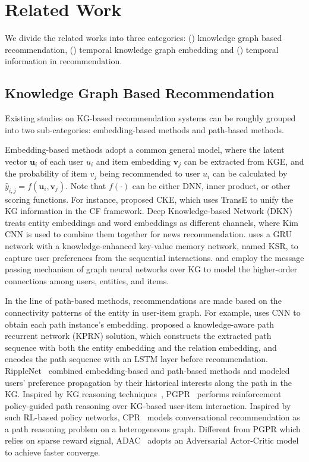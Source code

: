 \section{Related Work}
\label{sec:related}

We divide the related works into three categories: () knowledge 
graph based recommendation, () temporal knowledge graph embedding
and ()  temporal information in 
recommendation.


\subsection{Knowledge Graph Based Recommendation}

Existing studies on KG-based recommendation systems \cite{surveyRec} can be roughly grouped into two sub-categories: embedding-based methods and path-based
methods.

Embedding-based methods adopt a common general model, where the latent vector
$\boldsymbol{u}_i$ of each user $u_i$ and item embedding $\boldsymbol{v}_j$ can 
be
extracted from KGE, and the probability  of item $v_j$ being recommended to
user $u_i$ can be calculated by $\hat{y}_{i, j}=f\left(\mathbf{u}_{i},
\mathbf{v}_{j}\right)$. Note that $f(\cdot)$ can be either DNN, inner product,
or other scoring functions.  
%
For instance, \cite{CKE} proposed CKE, which uses TransE to unify the KG information in the CF framework.
%
Deep Knowledge-based Network (DKN) \cite{DKN} treats entity embeddings and word embeddings as different channels, where Kim CNN \cite{kimCNN} is used to combine them together for news recommendation.
\cite{KSR} uses a GRU network with a knowledge-enhanced key-value memory network, named KSR, to capture user preferences from the sequential interactions.
\cite{kgat} and \cite{kgin} employ the message passing mechanism of graph neural networks over KG to model the higher-order connections among users, entities, and items.


In the line of path-based methods, recommendations are made based on the connectivity patterns of the entity in user-item graph.
For example, \cite{mcrec} uses CNN to obtain each path instance's embedding.
%
\cite{kprn} proposed a knowledge-aware path recurrent network (KPRN) solution,
which constructs the extracted path sequence with both the entity embedding and
the relation embedding, and encodes the path sequence with an LSTM layer before
recommendation.  
%
RippleNet~\cite{ripplenet} combined embedding-based and path-based methods and
modeled users' preference propagation by their historical interests along the
path in the KG. 
%
Inspired by KG reasoning techniques~\cite{deeppath, multihop, gowalk}, PGPR~\cite{pgpr} performs reinforcement policy-guided path reasoning over
KG-based user-item interaction.
Inspired by such RL-based policy networks, CPR~\cite{RLconversa} models conversational recommendation as a path reasoning problem on a heterogeneous graph.
Different from PGPR which relies on sparse reward signal, ADAC~\cite{ADAC} adopts an Adversarial Actor-Critic model to achieve faster converge. 

